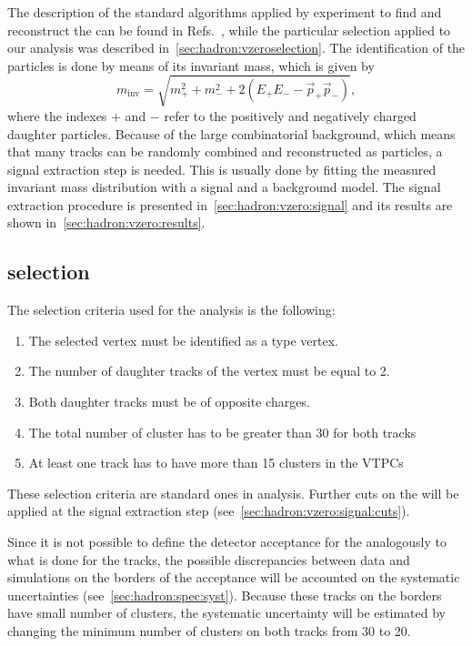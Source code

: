 The description of the standard algorithms applied by \NASixtyOne experiment
to find and reconstruct the \vzeros can be found in
Refs.~\cite{BarnaThesis,TobiaszThesis},
while the particular \vzero selection applied to our
analysis was described in~\cref{sec:hadron:vzeroselection}.
The identification of the \vzero particles is done by means of
its invariant mass, which is given by
\begin{equation}
  m_\text{inv} = \sqrt{m_+^2 + m_-^2 + 2(E_+E_--\vec{p}_+\vec{p}_-)},
\end{equation}
where the indexes $+$ and $-$ refer to the positively
and negatively charged daughter particles.
Because of the large combinatorial background, which means that
many tracks can be randomly combined and reconstructed as \vzero
particles, a signal extraction step is needed. This is usually done
by fitting the measured invariant mass distribution with a signal
and a background model. The signal extraction procedure is presented
in~\cref{sec:hadron:vzero:signal} and its results are shown
in~\cref{sec:hadron:vzero:results}.

\subsection{\vzero selection}
\label{sec:hadron:vzero:selection}


The \vzero selection criteria used for the \vzero analysis
is the following:
\begin{enumerate}[label=(\roman*)]
\item The selected vertex must be identified as a \vzero type vertex.
\item The number of daughter tracks of the vertex must be equal to 2.
\item Both daughter tracks must be of opposite charges.
\item The total number of cluster has to be greater than 30 for both tracks
\item At least one track has to have more than 15 clusters in the VTPCs
\end{enumerate}
These selection criteria are standard ones in \NASixtyOne analysis.
Further cuts on the \vzeros will be applied at the signal extraction
step (see~\cref{sec:hadron:vzero:signal:cuts}).

Since it is not possible to define the detector acceptance for
the \vzeros analogously to what is done for the tracks, the possible
discrepancies between data and simulations on the borders of the acceptance
will be accounted on the systematic uncertainties (see~\cref{sec:hadron:spec:syst}).
Because these tracks on the borders have small number of clusters,
the systematic uncertainty will be estimated by changing the minimum number
of clusters on both tracks from 30 to 20. 

